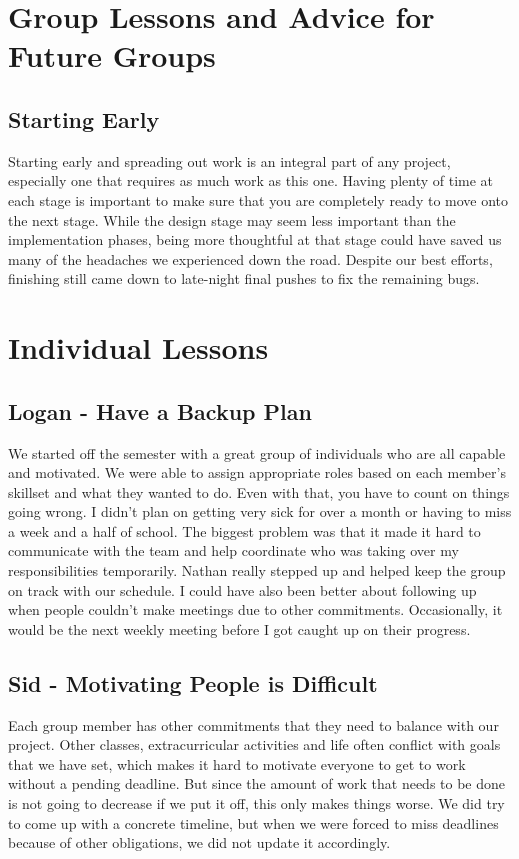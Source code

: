 \section{Group Lessons and Advice for Future Groups}
\subsection{Starting Early}
Starting early and spreading out work is an integral part of any project,
especially one that requires as much work as this one. Having plenty of time at
each stage is important to make sure that you are completely ready to move onto
the next stage. While the design stage may seem less important than the
implementation phases, being more thoughtful at that stage could have saved us
many of the headaches we experienced down the road. Despite our best efforts,
finishing still came down to late-night final pushes to fix the remaining bugs.

\section{Individual Lessons}
\subsection{Logan - Have a Backup Plan}
We started off the semester with a great group of individuals who are all
capable and motivated. We were able to assign appropriate roles based on each
member's skillset and what they wanted to do. Even with that, you have to count
on things going wrong. I didn’t plan on getting very sick for over a month or
having to miss a week and a half of school. The biggest problem was that it made
it hard to communicate with the team and help coordinate who was taking over my
responsibilities temporarily. Nathan really stepped up and helped keep the group
on track with our schedule. I could have also been better about following up
when people couldn’t make meetings due to other commitments. Occasionally, it
would be the next weekly meeting before I got caught up on their progress. 

\subsection{Sid - Motivating People is Difficult}
Each group member has other commitments that they need to balance with our
project. Other classes, extracurricular activities and life often conflict with
goals that we have set, which makes it hard to motivate everyone to get to work
without a pending deadline. But since the amount of work that needs to be done
is not going to decrease if we put it off, this only makes things worse. We did
try to come up with a concrete timeline, but when we were forced to miss
deadlines because of other obligations, we did not update it accordingly.

